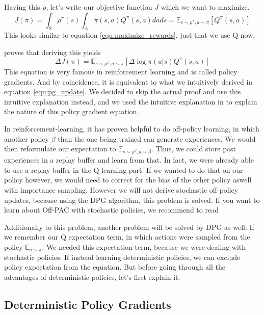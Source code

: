 \documentclass[hyperref,beleg]{cgvpub}
\begin{document}
Having this $\rho$, let's write our objective function $J$ which we want to maximize.
\begin{equation}
J(\pi) = \int_S \rho^{\pi}(s) \int_A \pi(s, a)Q^{\pi}(s, a) dads = \mathbb{E}_{s \sim \rho^{\pi}, a \sim \pi}[Q^{\pi}(s,a)]
\end{equation}
This looks similar to equation \ref{equ:maximize_rewards}, just that we use Q now.


\cite{suttonPolicyGradientMethods} proves that deriving this yields
\begin{equation}
\Delta J(\pi) = \mathbb{E}_{s \sim \rho^{\pi}, a \sim \pi}[\Delta \log \pi(a|s)Q^{\pi}(s, a)]
\label{equ:pg}
\end{equation}
This equation is very famous in reinforcement learning and is called policy gradients. And by coincidence, it is equivalent to what we intuitively derived in equation \ref{equ:pg_update}. We decided to skip the actual proof and use this intuitive explanation instead, and we used the intuitive explanation in \cite[Chapter 13, Section 3, after Equation 13.8]{suttonReinforcementLearningIntroduction2018} to explain the nature of this policy gradient equation.


In reinforcement-learning, it has proven helpful to do off-policy learning, in which another policy $\beta$ than the one being trained can generate experiences. We would then reformulate our expectation to $\mathbb{E}_{s \sim \rho^{\beta}, a \sim \beta}$. Thus, we could store past experiences in a replay buffer and learn from that. In fact, we were already able to use a replay buffer in the Q learning part. If we wanted to do that on our policy however, we would need to correct for the bias of the other policy aswell with importance sampling. However we will not derive stochastic off-policy updates, because using the \ac{DPG} algorithm, this problem is solved. If you want to learn about \ac{Off-PAC} with stochastic policies, we recommend to read \cite{degrisOffPolicyActorCritic2013}

Additionally to this problem, another problem will be solved by \ac{DPG} as well: If we remember our Q expectation term, in which actions were sampled from the policy $\mathbb{E}_{a \sim \pi}$. We needed this expectation term, because we were dealing with stochastic policies. If instead learning deterministic policies, we can exclude policy expectation from the equation. But before going through all the advantages of deterministic policies, let's first explain it.

\subsection{Deterministic Policy Gradients}
\end{document}
